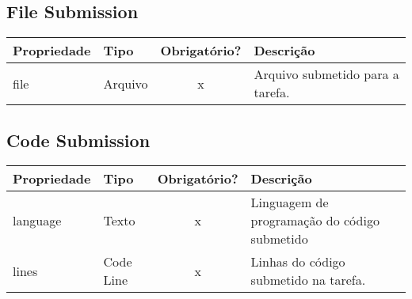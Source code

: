 \subsection{File Submission} \label{File Submission}
\begin{table}[H]
	\footnotesize
	\begin{tabularx}{\textwidth}{|X|X|c|p{7.8cm}|}   \hline \rowcolor[rgb]{0.8,0.8,0.8}
		
		\textbf{Propriedade} & \textbf{Tipo} & \textbf{Obrigatório?} & \centerline{\textbf{Descrição}} \\\hline  	
		
		file & Arquivo & x & Arquivo submetido para a tarefa. \\\hline				
		
	\end{tabularx}	
\end{table}


\subsection{Code Submission} \label{Code Submission}
\begin{table}[H]
	\footnotesize
	\begin{tabularx}{\textwidth}{|X|X|c|p{7.8cm}|}   \hline \rowcolor[rgb]{0.8,0.8,0.8}
		
		\textbf{Propriedade} & \textbf{Tipo} & \textbf{Obrigatório?} & \centerline{\textbf{Descrição}} \\\hline  	
		
		language & Texto & x & Linguagem de programação do código submetido \\\hline	
		lines & Code Line & x & Linhas do código submetido na tarefa. \\\hline			
		
	\end{tabularx}	
\end{table}


